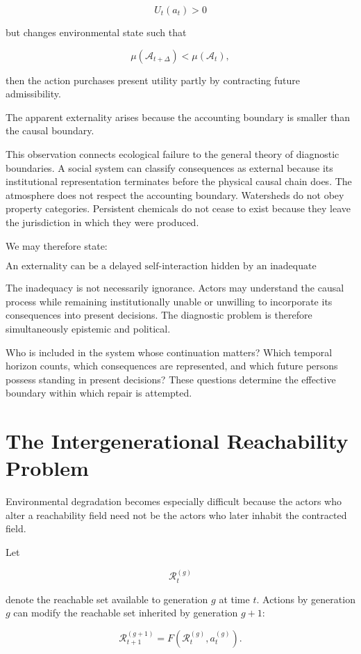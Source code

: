 \documentclass[11pt,oneside]{book}
\theoremstyle{definition}
\theoremstyle{remark}
\newcommand{\A}{\mathcal{A}}
\newcommand{\R}{\mathcal{R}}
\begin{document}
\[
U_t(a_t)>0
\]

but changes environmental state such that

\[
\mu(\A_{t+\Delta})<
\mu(\A_t),
\]

then the action purchases present utility partly by contracting future admissibility.

The apparent externality arises because the accounting boundary is smaller than the causal boundary.

This observation connects ecological failure to the general theory of diagnostic boundaries. A social system can classify consequences as external because its institutional representation terminates before the physical causal chain does. The atmosphere does not respect the accounting boundary. Watersheds do not obey property categories. Persistent chemicals do not cease to exist because they leave the jurisdiction in which they were produced.

We may therefore state:

\[
\boxed{
\text{An externality can be a delayed self-interaction hidden by an inadequate boundary.}
}
\]

The inadequacy is not necessarily ignorance. Actors may understand the causal process while remaining institutionally unable or unwilling to incorporate its consequences into present decisions. The diagnostic problem is therefore simultaneously epistemic and political.

Who is included in the system whose continuation matters? Which temporal horizon counts, which consequences are represented, and which future persons possess standing in present decisions? These questions determine the effective boundary within which repair is attempted.

\section{The Intergenerational Reachability Problem}

Environmental degradation becomes especially difficult because the actors who alter a reachability field need not be the actors who later inhabit the contracted field.

Let

\[
\R_t^{(g)}
\]

denote the reachable set available to generation \(g\) at time \(t\). Actions by generation \(g\) can modify the reachable set inherited by generation \(g+1\):

\[
\R_{t+1}^{(g+1)}
=
F\!\left(
\R_t^{(g)},
a_t^{(g)}
\right).
\]
\end{document}
